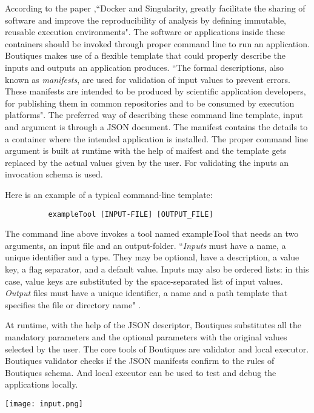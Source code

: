 According to the paper \cite{boutiques} ,``Docker and Singularity, greatly facilitate the sharing of software and improve the reproducibility of analysis by defining immutable, reusable execution environments". The software or applications inside these containers should be invoked through proper command line to run an application. Boutiques makes use of a flexible template that could properly describe the inputs and outputs an application produces. ``The formal descriptions, also known as \textit{manifests}, are used for validation of input values to prevent errors. These manifests are intended to be produced by scientific application developers, for publishing them in common repositories and to be consumed by execution platforms". The preferred way of describing these command line template, input and argument is through a JSON document. The manifest contains the details to a container where the intended application is installed. The proper command line argument is built at runtime with the help of maifest and the template gets replaced by the actual values given by the user. For validating the inputs an invocation schema is used.

Here is an example of a typical command-line template:

\begin{verbatim}
          exampleTool [INPUT-FILE] [OUTPUT_FILE]
\end{verbatim}

The command line above invokes a tool named exampleTool that needs an two arguments, an input file and an output-folder. ``\textit{Inputs} must have a name, a unique identifier and a type. They may be optional, have a description, a value key, a flag separator, and a default value. Inputs may also be ordered lists: in this case, value keys are substituted by the space-separated list of input values. \textit{Output} files must have a unique identifier, a name and a path template that specifies the file or directory name" \cite{boutiques}.

At runtime, with the help of the JSON descriptor, Boutiques substitutes all the mandatory parameters and the optional parameters with the original values selected by the user. The core tools of Boutiques are validator and local executor. Boutiques validator checks if the JSON manifests confirm to the rules of Boutiques schema. And local executor can be used to test and debug the applications locally.

\begin{center}
\texttt{[image: input.png]}
\label{fig:input}
\end{center}

